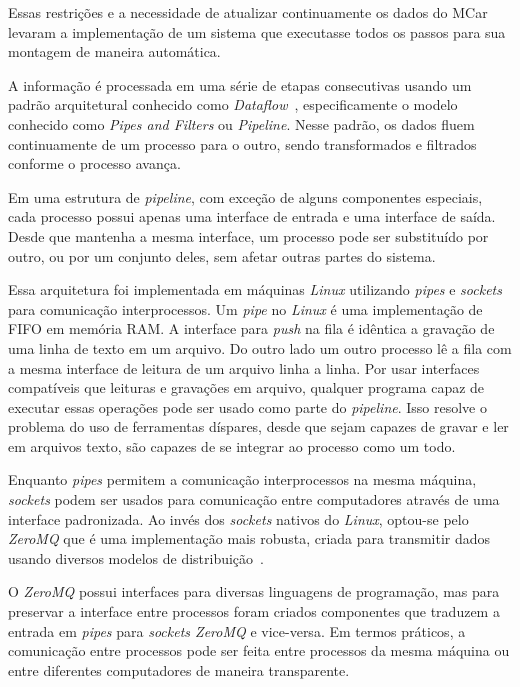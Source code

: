 \documentclass[12pt,a4paper]{article}
\begin{document}
Essas restrições e a necessidade de atualizar continuamente os dados do MCar levaram a implementação de um sistema que executasse todos os passos para sua montagem de maneira automática.

A informação é processada em uma série de etapas consecutivas usando um padrão arquitetural conhecido como \textit{Dataflow}~\cite{Carkci2014-jk, Hohpe2003-nj}, especificamente o modelo conhecido como \textit{Pipes and Filters} ou \textit{Pipeline}. Nesse padrão, os dados fluem continuamente de um processo para o outro, sendo transformados e filtrados conforme o processo avança. 

Em uma estrutura de \textit{pipeline}, com exceção de alguns componentes especiais, cada processo possui apenas uma interface de entrada e uma interface de saída. Desde que mantenha a mesma interface, um processo pode ser substituído por outro, ou por um conjunto deles, sem afetar outras partes do sistema.

Essa arquitetura foi implementada em máquinas \textit{Linux} utilizando \textit{pipes} e \textit{sockets} para comunicação interprocessos. Um \textit{pipe} no \textit{Linux} é uma implementação de FIFO em memória RAM. A interface para \textit{push} na fila é idêntica a gravação de uma linha de texto em um arquivo. Do outro lado um outro processo lê a fila com a mesma interface de leitura de um arquivo linha a linha. Por usar interfaces compatíveis que leituras e gravações em arquivo, qualquer programa capaz de executar essas operações pode ser usado como parte do \textit{pipeline}. Isso resolve o problema do uso de ferramentas díspares, desde que sejam capazes de gravar e ler em arquivos texto, são capazes de se integrar ao processo como um todo.

Enquanto \textit{pipes} permitem a comunicação interprocessos na mesma máquina, \textit{sockets} podem ser usados para comunicação entre computadores através de uma interface padronizada. Ao invés dos \textit{sockets} nativos do \textit{Linux}, optou-se pelo \textit{ZeroMQ} que é uma implementação mais robusta, criada para transmitir dados usando diversos modelos de distribuição~\cite{Hintjens2013-tz}.

O \textit{ZeroMQ} possui interfaces para diversas linguagens de programação, mas para preservar a interface entre processos foram criados componentes que traduzem a entrada em \textit{pipes} para \textit{sockets ZeroMQ} e vice-versa. Em termos práticos, a comunicação entre processos pode ser feita entre processos da mesma máquina ou entre diferentes computadores de maneira transparente.
\end{document}
